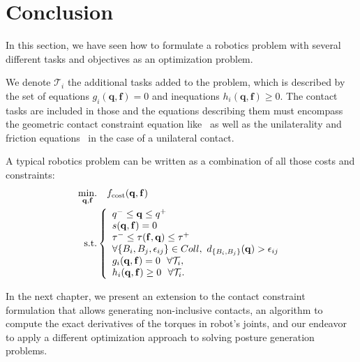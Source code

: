 \section{Conclusion}
\label{sec:Ch1_Conclusion}


In this section, we have seen how to formulate a robotics problem with several different tasks and objectives as an optimization problem.

We denote $\mathcal{T}_i$ the additional tasks added to the problem, which is described by the set of equations $g_i(\mathbf{q},\mathbf{f}) = 0$ and inequations $h_i(\mathbf{q},\mathbf{f}) \geq 0$.
The contact tasks are included in those and the equations describing them must encompass the geometric contact constraint equation like~ as well as the unilaterality and friction equations~ in the case of a unilateral contact.

A typical robotics problem can be written as a combination of all those costs and constraints:
\begin{align}
\operatorname*{min.}_{\mathbf{q}, \mathbf{f}} & \quad f_\text{cost}(\mathbf{q},\mathbf{f}) \nonumber\\
\text{s.t.}&
\left\{
\begin{array}{lr}
q^- \le \mathbf{q} \le q^+\\
s(\mathbf{q},\mathbf{f}) = 0 \\
\tau^- \le \tau(\mathbf{f},\mathbf{q}) \le \tau^+\\
\forall \{B_i, B_j, \epsilon_{ij}\} \in Coll,\ d_{\{B_i, B_j\}}(\mathbf{q}) > \epsilon_{ij}\\
g_i(\mathbf{q},\mathbf{f}) = 0\ \ \forall\mathcal{T}_i,\\
h_i(\mathbf{q},\mathbf{f}) \geq 0\ \ \forall\mathcal{T}_i.
\end{array}\right.
\label{eq:PG}
\end{align}

In the next chapter, we present an extension to the contact constraint formulation that allows generating non-inclusive contacts, an algorithm to compute the exact derivatives of the torques in robot's joints, and our endeavor to apply a different optimization approach to solving posture generation problems.
